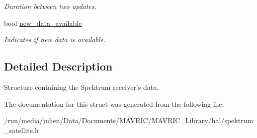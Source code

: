 \begin{DoxyCompactItemize}
\begin{DoxyCompactList}\small\item\em Duration between two updates. \end{DoxyCompactList}\item 
\hypertarget{structspektrum__satellite__t_a40364b178c8fcf12f1c6831cbe130f99}{bool \hyperlink{structspektrum__satellite__t_a40364b178c8fcf12f1c6831cbe130f99}{new\+\_\+data\+\_\+available}}\label{structspektrum__satellite__t_a40364b178c8fcf12f1c6831cbe130f99}

\begin{DoxyCompactList}\small\item\em Indicates if new data is available. \end{DoxyCompactList}\end{DoxyCompactItemize}


\subsection{Detailed Description}
Structure containing the Spektrum receiver's data. 

The documentation for this struct was generated from the following file\+:\begin{DoxyCompactItemize}
\item 
/run/media/julien/\+Data/\+Documents/\+M\+A\+V\+R\+I\+C/\+M\+A\+V\+R\+I\+C\+\_\+\+Library/hal/spektrum\+\_\+satellite.\+h\end{DoxyCompactItemize}
